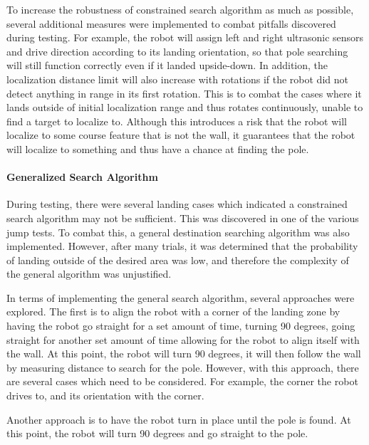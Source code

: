 \documentclass[ece]{uw-wkrpt}
\begin{document}
To increase the robustness of constrained search algorithm as much as possible, several additional measures were implemented to combat pitfalls discovered during testing. For example, the robot will assign left and right ultrasonic sensors and drive direction according to its landing orientation, so that pole searching will still function correctly even if it landed upside-down. In addition, the localization distance limit will also increase with rotations if the robot did not detect anything in range in its first rotation. This is to combat the cases where it lands outside of initial localization range and thus rotates continuously, unable to find a target to localize to. Although this introduces a risk that the robot will localize to some course feature that is not the wall, it guarantees that the robot will localize to something and thus have a chance at finding the pole. 

\paragraph{Generalized Search Algorithm}

During testing, there were several landing cases which indicated a constrained search algorithm may not be sufficient. This was discovered in one of the various jump tests. To combat this, a general destination searching algorithm was also implemented. However, after many trials, it was determined that the probability of landing outside of the desired area was low, and therefore the complexity of the general algorithm was unjustified.

In terms of implementing the general search algorithm, several approaches were explored. The first is to align the robot with a corner of the landing zone by having the robot go straight for a set amount of time, turning 90 degrees, going straight for another set amount of time allowing for the robot to align itself with the wall. At this point, the robot will turn 90 degrees, it will then follow the wall by measuring distance to search for the pole. However, with this approach, there are several cases which need to be considered. For example, the corner the robot drives to, and its orientation with the corner. 

Another approach is to have the robot turn in place until the pole is found. At this point, the robot will turn 90 degrees and go straight to the pole. 
\end{document}
